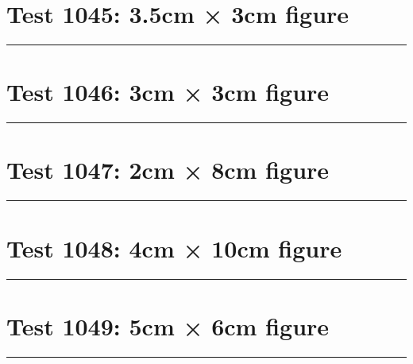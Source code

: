 \documentclass[a4paper,11pt]{article}
\begin{document}
\section*{Test 1045: 3.5cm × 3cm figure}
\begin{swarmwrap}%
  \begin{minipage}[t]{3cm}
    \centering
    \rule{\linewidth}{3cm}
  \end{minipage}%
\end{swarmwrap}%
\swarmwrapnext
\lipsum[116]
\lipsum[117]
\lipsum[118]
\lipsum[119]
\lipsum[120]
\lipsum[121]
\section*{Test 1046: 3cm × 3cm figure}
\begin{swarmwrap}%
  \begin{minipage}[t]{3cm}
    \centering
    \rule{\linewidth}{3cm}
  \end{minipage}%
\end{swarmwrap}%
\swarmwrapnext
\lipsum[6]
\lipsum[7]
\lipsum[8]
\lipsum[9]
\lipsum[10]
\lipsum[11]
\section*{Test 1047: 2cm × 8cm figure}
\begin{swarmwrap}%
  \begin{minipage}[t]{2cm}
    \centering
    \rule{\linewidth}{8cm}
  \end{minipage}%
\end{swarmwrap}%
\swarmwrapnext
\lipsum[11]
\lipsum[12]
\lipsum[13]
\lipsum[14]
\lipsum[15]
\lipsum[16]
\section*{Test 1048: 4cm × 10cm figure}
\begin{swarmwrap}%
  \begin{minipage}[t]{4cm}
    \centering
    \rule{\linewidth}{10cm}
  \end{minipage}%
\end{swarmwrap}%
\swarmwrapnext
\lipsum[25]
\lipsum[26]
\lipsum[27]
\section*{Test 1049: 5cm × 6cm figure}
\begin{swarmwrap}%
  \begin{minipage}[t]{5cm}
    \centering
    \rule{\linewidth}{6cm}
  \end{minipage}%
\end{swarmwrap}%
\swarmwrapnext
\lipsum[118]
\lipsum[119]
\lipsum[120]
\lipsum[121]
\end{document}
